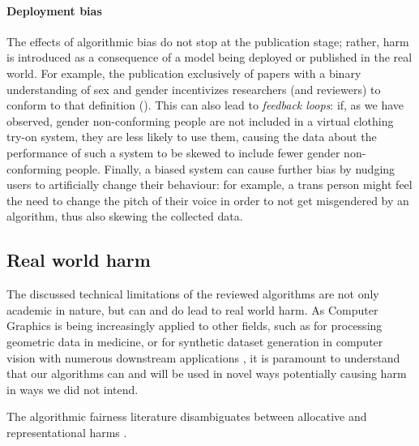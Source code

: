\documentclass[nonacm,sigconf,review,balance=false]{acmart}
\begin{document}




\paragraph*{Deployment bias} The effects of algorithmic bias do not stop at the publication stage; rather, harm is introduced as a consequence of a model being deployed or published in the real world. For example, the publication exclusively of papers with a binary understanding of sex and gender incentivizes researchers (and reviewers) to conform to that definition (\binary).
This can also lead to \emph{feedback loops}: if, as we have observed, gender non-conforming people are not included in a virtual clothing try-on system, they are less likely to use them, causing the data about the performance of such a system to be skewed to include fewer gender non-conforming people. Finally, a biased system can cause further bias by nudging users to artificially change their behaviour: for example, a trans person might feel the need to change the pitch of their voice in order to not get misgendered by an algorithm, thus also skewing the collected data.

\subsection{Real world harm}

The discussed technical limitations of the reviewed algorithms are not only academic in nature, but can and do lead to real world harm. As Computer Graphics is being increasingly applied to other fields, such as for processing geometric data in medicine, or for synthetic dataset generation in computer vision with numerous downstream applications \cite{cars, chen2021synthetic, dhs}, it is paramount to understand that our algorithms can and will be used in novel ways potentially causing harm in ways we did not intend.

The algorithmic fairness literature disambiguates between allocative and representational harms .
\end{document}
